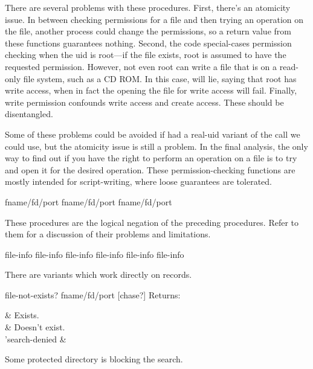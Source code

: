 \begin{desc}
    There are several problems with these procedures. First, there's an
    atomicity issue. In between checking permissions for a file and then trying
    an operation on the file, another process could change the permissions,
    so a return value from these functions guarantees nothing. Second, 
    the code special-cases permission checking when the uid is root---if
    the file exists, root is assumed to have the requested permission.
    However, not even root can write a file that is on a read-only file system,
    such as a CD ROM. In this case,  will lie, saying
    that root has write access, when in fact the opening the file for write
    access will fail.
    Finally, write permission confounds write access and create access.
    These should be disentangled.

    Some of these problems could be avoided if {\Posix} had a real-uid
    variant of the  call we could use, but the atomicity
    issue is still a problem. In the final analysis, the only way to
    find out if you have the right to perform an operation on a file
    is to try and open it for the desired operation. These permission-checking
    functions are mostly intended for script-writing, where loose guarantees
    are tolerated.
\end{desc}

   {fname/fd/port} \boolean
{}   {fname/fd/port} \boolean
{} {fname/fd/port} \boolean
\begin{desc}
    These procedures are the logical negation of the 
    preceding  procedures.
    Refer to them for a discussion of their problems and limitations.
\end{desc}

  {file-info} \boolean
{}  {file-info} \boolean
{} {file-info} \boolean
{}   {file-info} \boolean
{}   {file-info} \boolean
{} {file-info} \boolean

There are variants which work directly on  records.

\begin{defundesc}{file-not-exists?} {fname/fd/port [chase?]} \object
Returns:
    \begin{optiontable}    
    \sharpf            & Exists. \\
    \sharpt            & Doesn't exist. \\
    'search-denied     & \parbox[t]{0.5\linewidth}{\sloppy\raggedright
                            Some protected directory
                            is blocking the search.}
    \end{optiontable}
\end{defundesc}

